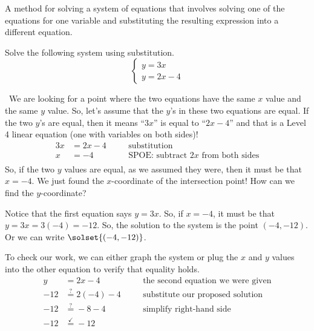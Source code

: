 \begin{boxdef}
A method for solving a system of equations that involves solving one of the equations for one variable and substituting the resulting expression into a different equation.
\end{boxdef}


\begin{boxex}
Solve the following system using substitution.
\[
\left\{%
\begin{array}{l}
y=3x\\
y=2x-4
\end{array}
\right.
\] 

\exsoln\ We are looking for a point where the two equations have the same $x$ value and the same $y$ value. So, let's assume that the $y$'s in these two equations  are equal. If the two $y$'s are equal, then it means ``$3x$'' is equal to ``$2x-4$'' and that is a Level 4 linear equation (one with variables on both sides)!
\[\begin{aligned}
3x &= 2x -4
&& \quad\text{substitution}\\
x &= -4
&& \quad\text{SPOE: subtract $2x$ from both sides}\\
\end{aligned}\]
So, if the two $y$ values are equal, as we assumed they were, then it must be that $x=-4$. We just found the $x$-coordinate of the intersection point! How can we find the $y$-coordinate?

Notice that the first equation says $y = 3x$. So, if $x=-4$, it must be that $y = 3x = 3(-4) = -12$. So, the solution to the system is the point $(-4, -12)$. Or we can write $\solset{(-4,-12)}$.

To check our work, we can either graph the system or plug the $x$ and $y$ values into the other equation to verify that equality holds.
\[\begin{aligned}
y &= 2x -4
&& \quad\text{the second equation we were given}\\
-12 &\overset{?}{=} 2(-4)-4
&& \quad\text{substitute our proposed solution}\\
-12 &\overset{?}{=} -8-4
&& \quad\text{simplify right-hand side}\\
-12 &\overset{\checkmark}{=} -12
&& \quad\text{}\\
\end{aligned}\]
\end{boxex}

